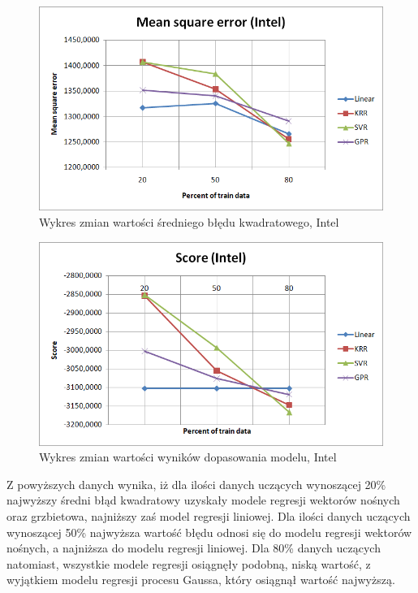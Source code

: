 \begin{figure}[h!]
\centering
\includegraphics[width=150mm]{pictures/plots/intel_mean_square.png}
\caption{Wykres zmian wartości średniego błędu kwadratowego, Intel}
\label{fig:intel_mean_square}
\end{figure}

\begin{figure}[h!]
\centering
\includegraphics[width=150mm]{pictures/plots/intel_score.png}
\caption{Wykres zmian wartości wyników dopasowania modelu, Intel}
\label{fig:intel_score}
\end{figure}

Z powyższych danych wynika, iż dla ilości danych uczących wynoszącej 20\% najwyższy średni błąd kwadratowy uzyskały modele regresji wektorów nośnych oraz grzbietowa, najniższy zaś model regresji liniowej.
Dla ilości danych uczących wynoszącej 50\% najwyższa wartość błędu odnosi się do modelu regresji wektorów nośnych, a najniższa do modelu regresji liniowej.
Dla 80\% danych uczących natomiast, wszystkie modele regresji osiągnęły podobną, niską wartość, z wyjątkiem modelu regresji procesu Gaussa, który osiągnął wartość najwyższą.\\

